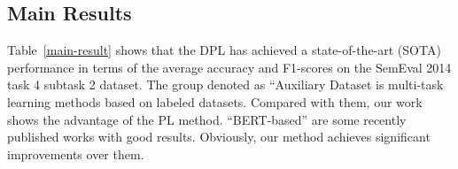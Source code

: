 \documentclass[11pt]{article}
\begin{document}
\subsection{Main Results}
\begin{table}
\centering
{}
\caption{\label{main-result} Results of different methods. ``BERT'' represents the works that are also based on the BERT ~\cite{devlin2018bert}, ``Auxiliary'' represents the methods that also utilize auxiliary datasets to help the ABSA task. ``*'' means our replication results. The results show that our method achieves state-of-the-art in this benchmark.}
\end{table}
Table~\ref{main-result} shows that the DPL has achieved a state-of-the-art (SOTA) performance in terms of the average accuracy and F1-scores on the SemEval 2014 task 4 subtask 2 dataset.
The group denoted as ``Auxiliary Dataset is multi-task learning methods based on labeled datasets. Compared with them, our work shows the advantage of the PL method. 
``BERT-based'' are some recently published works with good results. Obviously, our method achieves significant improvements over them.
\end{document}

